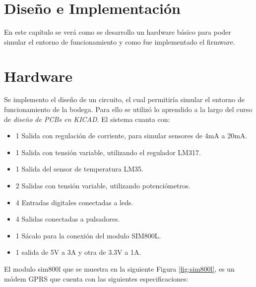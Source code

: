 \section{Diseño e Implementación}
En este capítulo se verá como se desarrollo un hardware básico para poder simular el entorno de funcionamiento y como fue implementado el firmware.

\section{Hardware}

Se implemento el diseño de un circuito, el cual permitiría simular el entorno de funcionamiento de la bodega. Para ello se utilizó lo aprendido a la largo del curso de \emph{diseño de PCBs en KICAD}. El sistema cuanta con:
  \begin{itemize}
    \item 1 Salida con regulación de corriente, para simular sensores de 4mA a 20mA.
    \item 1 Salida con tensión variable, utilizando el regulador LM317.
    \item 1 Salida del sensor de temperatura LM35.
    \item 2 Salidas con tensión variable, utilizando potenciómetros. 
    \item 4 Entradas digitales conectadas a leds.
    \item 4 Salidas conectadas a pulsadores. 
    \item 1 Sácalo para la conexión del modulo SIM800L. 
    \item 1 salida de 5V a 3A y otra de 3.3V a 1A. 
  \end{itemize}

El modulo sim800l que se muestra en la siguiente Figura \ref{fig:sim800l}, es un módem GPRS que cuenta con las siguientes especificaciones:

